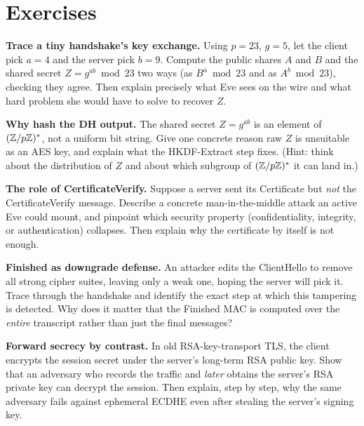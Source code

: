 \section{Exercises}

\begin{exercise}
\textbf{Trace a tiny handshake's key exchange.} Using $p = 23$, $g = 5$, let the
client pick $a = 4$ and the server pick $b = 9$. Compute the public shares $A$ and
$B$ and the shared secret $Z = g^{ab} \bmod 23$ two ways (as $B^a \bmod 23$ and as
$A^b \bmod 23$), checking they agree. Then explain precisely what Eve sees on the
wire and what hard problem she would have to solve to recover $Z$.
\end{exercise}

\begin{exercise}
\textbf{Why hash the DH output.} The shared secret $Z = g^{ab}$ is an element of
$(\mathbb{Z}/p\mathbb{Z})^{*}$, not a uniform bit string. Give one concrete reason raw $Z$ is unsuitable
as an AES key, and explain what the HKDF-Extract step fixes. (Hint: think about the
distribution of $Z$ and about which subgroup of $(\mathbb{Z}/p\mathbb{Z})^{*}$ it can land in.)
\end{exercise}

\begin{exercise}
\textbf{The role of CertificateVerify.} Suppose a server sent its Certificate but
\emph{not} the CertificateVerify message. Describe a concrete man-in-the-middle
attack an active Eve could mount, and pinpoint which security property
(confidentiality, integrity, or authentication) collapses. Then explain why the
certificate by itself is not enough.
\end{exercise}

\begin{exercise}
\textbf{Finished as downgrade defense.} An attacker edits the ClientHello to remove
all strong cipher suites, leaving only a weak one, hoping the server will pick it.
Trace through the handshake and identify the exact step at which this tampering is
detected. Why does it matter that the Finished MAC is computed over the
\emph{entire} transcript rather than just the final messages?
\end{exercise}

\begin{exercise}
\textbf{Forward secrecy by contrast.} In old RSA-key-transport TLS, the client
encrypts the session secret under the server's long-term RSA public key. Show that
an adversary who records the traffic and \emph{later} obtains the server's RSA
private key can decrypt the session. Then explain, step by step, why the same
adversary fails against ephemeral ECDHE even after stealing the server's signing
key.
\end{exercise}

